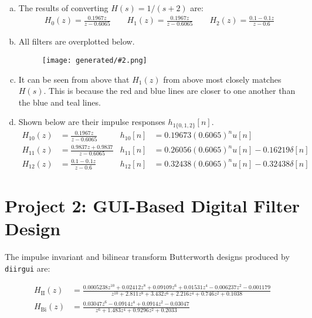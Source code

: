 \documentclass{ajhlabreport}
\newcommand{\generatedfigw}[2]{
	\texttt{[image: generated/\#2.png]}
}
\begin{document}
\begin{enumerate}[(a)]
%
\item The results of converting $H(s) = 1/(s + 2)$ are:
\begin{align*}
H_0(z) = \frac{0.1967 z}{z - 0.6065}
\qquad
H_1(z) = \frac{0.1967 z}{z - 0.6065}
\qquad
H_2(z) = \frac{0.1 - 0.1 z}{z - 0.6}
\end{align*}
\item All filters are overplotted below.
\begin{figure}[H]\centering\generatedfigw{0.9}{p1e2-magnitudes}\end{figure}
%
\item It can be seen from above that $H_1(z)$ from above most closely matches
$H(s)$. This is because the red and blue lines are closer to one another than
the blue and teal lines.
%
\item Shown below are their impulse responses $h_{1\{0,1,2\}}[n]$.
\begin{align*}
H_{10}(z) &= \frac{0.1967 z}{z - 0.6065}
&
h_{10}[n] &= 0.19673 (0.6065)^n u[n]
\\
H_{11}(z) &= \frac{0.9837 z + 0.9837}{z - 0.6065}
&
h_{11}[n] &= 0.26056 (0.6065)^n u[n] - 0.16219 \delta[n]
\\
H_{12}(z) &= \frac{0.1 - 0.1 z}{z - 0.6}
&
h_{12}[n] &= 0.32438 (0.6065)^n u[n] - 0.32438 \delta[n]
\end{align*}
\begin{figure}[H]
\end{figure}
%
\end{enumerate}




\newpage
\chapter{Project 2: GUI-Based Digital Filter Design}%

The impulse invariant and bilinear transform Butterworth designs produced by
\texttt{diirgui} are:

\begin{align*}
H_\text{II}(z) &= \frac{0.0005238 z^{10} + 0.02412 z^8 + 0.09109 z^6 + 0.01531 z^4 - 0.006237 z^2 - 0.001179}{z^{10} + 2.811 z^8 + 3.432 z^6 + 2.216 z^4 + 0.746 z^2 + 0.1038} \\
H_\text{Bi}(z) &= \frac{0.03047 z^6 - 0.0914 z^4 + 0.0914 z^2 - 0.03047}{z^6 + 1.483 z^4 + 0.9296 z^2 + 0.2033}
\end{align*}
\end{document}
